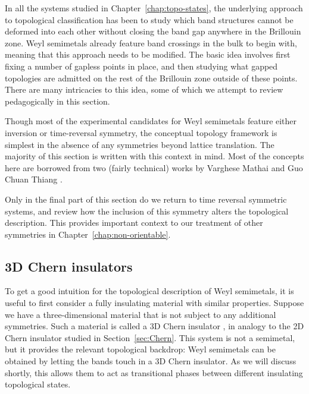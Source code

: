 In all the systems studied in Chapter~\ref{chap:topo-states}, the underlying approach to topological classification has been to study which band structures cannot be deformed into each other without closing the band gap anywhere in the Brillouin zone. Weyl semimetals already feature band crossings in the bulk to begin with, meaning that this approach needs to be modified. The basic idea involves first fixing a number of gapless points in place, and then studying what gapped topologies are admitted on the rest of the Brillouin zone outside of these points. There are many intricacies to this idea, some of which we attempt to review pedagogically in this section.

Though most of the experimental candidates for Weyl semimetals feature either inversion or time-reversal symmetry, the conceptual topology framework is simplest in the absence of any symmetries beyond lattice translation. The majority of this section is written with this context in mind. Most of the concepts here are borrowed from two (fairly technical) works by Varghese Mathai and Guo Chuan Thiang \cite{Mathai_math-review,Mathai_math-paper}.

Only in the final part of this section do we return to time reversal symmetric systems, and review how the inclusion of this symmetry alters the topological description. This provides important context to our treatment of other symmetries in Chapter~\ref{chap:non-orientable}.

\subsection{3D Chern insulators}\label{sec:3D-Chern}

To get a good intuition for the topological description of Weyl semimetals, it is useful to first consider a fully insulating material with similar properties. Suppose we have a three-dimensional material that is not subject to any additional symmetries. Such a material is called a 3D Chern insulator \cite{Vanderbilt_2018,Liu_photonic-Chern-vector,Devescovi_3D-Chern}, in analogy to the 2D Chern insulator studied in Section~\ref{sec:Chern}. This system is not a semimetal, but it provides the relevant topological backdrop: Weyl semimetals can be obtained by letting the bands touch in a 3D Chern insulator. As we will discuss shortly, this allows them to act as transitional phases between different insulating topological states.

